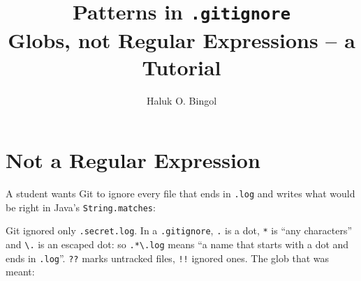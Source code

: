\documentclass[11pt,a4paper]{article}
\title{Patterns in \texttt{.gitignore}\\[0.3em]\large Globs, not Regular Expressions -- a Tutorial}
\author[Bingol]{Haluk O. Bingol}
\institute[FCIS]{
    Faculty of Computer and Information Sciences\\
    Yeditepe University
}
\date{
	{\tiny \hbTimeStamp}
}
\begin{document}
\maketitle
\thispagestyle{hbhandout}

\begin{center}
\end{center}



\section{Not a Regular Expression}
\label{sec:notregex}


A student wants Git to ignore every file that ends in \texttt{.log} and writes what would be right in Java's \texttt{String.matches}:


Git ignored only \texttt{.secret.log}. In a \texttt{.gitignore}, \texttt{.} is a dot, \texttt{*} is ``any characters'' and
\texttt{\textbackslash.} is an escaped dot: so \texttt{.*\textbackslash.log} means ``a name that starts with a dot and ends in
\texttt{.log}''. \texttt{??} marks untracked files, \texttt{!!} ignored ones. The glob that was meant:

\end{document}
